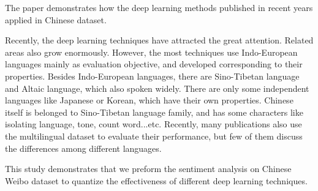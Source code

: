 \begin{abstractEN}

The paper demonstrates how the deep learning methods published in recent years applied in Chinese dataset.

Recently, the deep learning techniques have attracted the great attention. Related areas also grow enormously. 
However, the most techniques use Indo-European languages mainly as evaluation objective, and developed corresponding to their properties.  
Besides Indo-European languages, there are Sino-Tibetan language and Altaic language, which also spoken widely. 
There are only some independent languages like Japanese or Korean, which have their own properties.
Chinese itself is belonged to Sino-Tibetan language family, and has some characters like isolating language, tone, count word...etc.
Recently, many publications also use the multilingual dataset to evaluate their performance, but few of them discuss the differences among different languages. 

This study demonstrates that we preform the sentiment analysis on Chinese Weibo dataset to quantize the effectiveness of different deep learning techniques.

\end{abstractEN}

